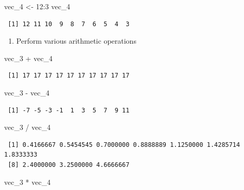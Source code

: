 \documentclass[
  letterpaper,
  DIV=11,
  numbers=noendperiod]{scrreprt}
\newenvironment{Shaded}{\begin{snugshade}}{\end{snugshade}}
\newcommand{\DecValTok}[1]{\textcolor[rgb]{0.68,0.00,0.00}{#1}}
\newcommand{\NormalTok}[1]{\textcolor[rgb]{0.00,0.23,0.31}{#1}}
\newcommand{\OtherTok}[1]{\textcolor[rgb]{0.00,0.23,0.31}{#1}}
\newcommand{\SpecialCharTok}[1]{\textcolor[rgb]{0.37,0.37,0.37}{#1}}
\providecommand{\tightlist}{%
  \setlength{\itemsep}{0pt}\setlength{\parskip}{0pt}}\usepackage{longtable,booktabs,array}
\begin{document}
\begin{Shaded}
\begin{Highlighting}[]
\NormalTok{vec\_4 }\OtherTok{\textless{}{-}} \DecValTok{12}\SpecialCharTok{:}\DecValTok{3}
\NormalTok{vec\_4}
\end{Highlighting}
\end{Shaded}

\begin{verbatim}
 [1] 12 11 10  9  8  7  6  5  4  3
\end{verbatim}

\begin{enumerate}
\def\labelenumi{\alph{enumi}.}
\setcounter{enumi}{1}
\tightlist
\item
  Perform various arithmetic operations
\end{enumerate}

\begin{Shaded}
\begin{Highlighting}[]
\NormalTok{vec\_3 }\SpecialCharTok{+}\NormalTok{ vec\_4}
\end{Highlighting}
\end{Shaded}

\begin{verbatim}
 [1] 17 17 17 17 17 17 17 17 17 17
\end{verbatim}

\begin{Shaded}
\begin{Highlighting}[]
\NormalTok{vec\_3 }\SpecialCharTok{{-}}\NormalTok{ vec\_4}
\end{Highlighting}
\end{Shaded}

\begin{verbatim}
 [1] -7 -5 -3 -1  1  3  5  7  9 11
\end{verbatim}

\begin{Shaded}
\begin{Highlighting}[]
\NormalTok{vec\_3 }\SpecialCharTok{/}\NormalTok{ vec\_4}
\end{Highlighting}
\end{Shaded}

\begin{verbatim}
 [1] 0.4166667 0.5454545 0.7000000 0.8888889 1.1250000 1.4285714 1.8333333
 [8] 2.4000000 3.2500000 4.6666667
\end{verbatim}

\begin{Shaded}
\begin{Highlighting}[]
\NormalTok{vec\_3 }\SpecialCharTok{*}\NormalTok{ vec\_4}
\end{Highlighting}
\end{Shaded}
\end{document}
